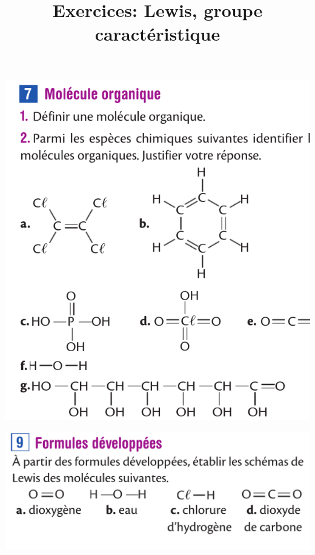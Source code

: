 \documentclass[10pt]{article}
\newcommand{\titreActivite}{\huge Exercices: Lewis, groupe caractéristique} %
\begin{document}
\date{}
\title{\titreActivite}
\maketitle %


\begin{center}

	\begin{minipage}[c]{0.45\textwidth}
		\centering

		\includegraphics[scale=0.4]{assets/7.png}

		\includegraphics[scale=0.15]{assets/9.png}


\end{minipage}
\end{center}
\end{document}
